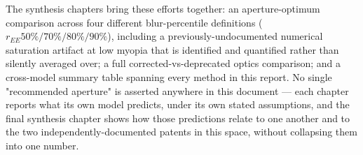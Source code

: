 The synthesis chapters bring these efforts together: an aperture-optimum comparison
across four different blur-percentile definitions ($r_{EE}50\%/70\%/80\%/90\%$),
including a previously-undocumented numerical saturation artifact at low myopia that
is identified and quantified rather than silently averaged over; a full corrected-vs-deprecated
optics comparison; and a cross-model summary table spanning every method in this
report. No single "recommended aperture" is asserted anywhere in this document --- each
chapter reports what its own model predicts, under its own stated assumptions, and the
final synthesis chapter shows how those predictions relate to one another and to the
two independently-documented patents in this space, without collapsing them into one
number.
